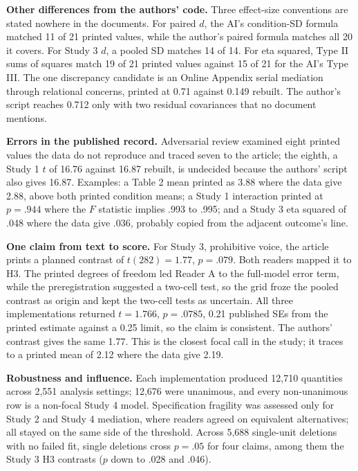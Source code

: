 \documentclass[11pt]{article}
\begin{document}
\textbf{Other differences from the authors' code.} Three effect-size conventions are stated nowhere in the documents. For paired $d$, the AI's condition-SD formula matched 11 of 21 printed values, while the author's paired formula matches all 20 it covers. For Study 3 $d$, a pooled SD matches 14 of 14. For eta squared, Type II sums of squares match 19 of 21 printed values against 15 of 21 for the AI's Type III. The one discrepancy candidate is an Online Appendix serial mediation through relational concerns, printed at 0.71 against 0.149 rebuilt. The author's script reaches 0.712 only with two residual covariances that no document mentions.

\textbf{Errors in the published record.} Adversarial review examined eight printed values the data do not reproduce and traced seven to the article; the eighth, a Study 1 $t$ of 16.76 against 16.87 rebuilt, is undecided because the authors' script also gives 16.87. Examples: a Table 2 mean printed as 3.88 where the data give 2.88, above both printed condition means; a Study 1 interaction printed at $p=.944$ where the $F$ statistic implies .993 to .995; and a Study 3 eta squared of .048 where the data give .036, probably copied from the adjacent outcome's line.

\textbf{One claim from text to score.} For Study 3, prohibitive voice, the article prints a planned contrast of $t(282)=1.77$, $p=.079$. Both readers mapped it to H3. The printed degrees of freedom led Reader A to the full-model error term, while the preregistration suggested a two-cell test, so the grid froze the pooled contrast as origin and kept the two-cell tests as uncertain. All three implementations returned $t=1.766$, $p=.0785$, 0.21 published SEs from the printed estimate against a 0.25 limit, so the claim is consistent. The authors' contrast gives the same 1.77. This is the closest focal call in the study; it traces to a printed mean of 2.12 where the data give 2.19.

\textbf{Robustness and influence.} Each implementation produced 12,710 quantities across 2,551 analysis settings; 12,676 were unanimous, and every non-unanimous row is a non-focal Study 4 model. Specification fragility was assessed only for Study 2 and Study 4 mediation, where readers agreed on equivalent alternatives; all stayed on the same side of the threshold. Across 5,688 single-unit deletions with no failed fit, single deletions cross $p=.05$ for four claims, among them the Study 3 H3 contrasts ($p$ down to .028 and .046).
\end{document}
